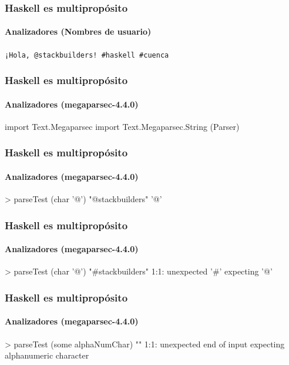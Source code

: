 \documentclass[spanish]{beamer}
\begin{document}
\begin{frame}
  \frametitle{Haskell es multipropósito}
  \framesubtitle{Analizadores (Nombres de usuario)}

  \texttt{¡Hola, @\alert<2>{stackbuilders}! \#haskell \#cuenca}
\end{frame}


\begin{frame}[fragile]
  \frametitle{Haskell es multipropósito}
  \framesubtitle{Analizadores (megaparsec-4.4.0)}

  \begin{code}
import Text.Megaparsec
import Text.Megaparsec.String (Parser)
  \end{code}
\end{frame}


\begin{frame}[fragile]
  \frametitle{Haskell es multipropósito}
  \framesubtitle{Analizadores (megaparsec-4.4.0)}

  \begin{code}
> parseTest (char '@') "@stackbuilders"
'@'
  \end{code}
\end{frame}


\begin{frame}[fragile]
  \frametitle{Haskell es multipropósito}
  \framesubtitle{Analizadores (megaparsec-4.4.0)}

  \begin{code}
> parseTest (char '@') "#stackbuilders"
1:1:
unexpected '#'
expecting '@'
  \end{code}
\end{frame}


\begin{frame}[fragile]
  \frametitle{Haskell es multipropósito}
  \framesubtitle{Analizadores (megaparsec-4.4.0)}

  \begin{code}
> parseTest (some alphaNumChar) ""
1:1:
unexpected end of input
expecting alphanumeric character
  \end{code}
\end{frame}
\end{document}
